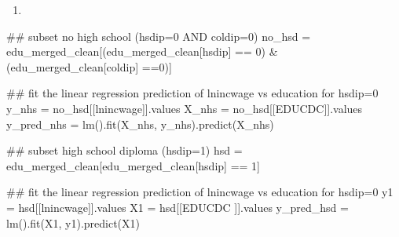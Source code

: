 \documentclass[
  letterpaper,
  DIV=11,
  numbers=noendperiod]{scrartcl}
\newenvironment{Shaded}{\begin{snugshade}}{\end{snugshade}}
\newcommand{\CommentTok}[1]{\textcolor[rgb]{0.37,0.37,0.37}{#1}}
\newcommand{\DecValTok}[1]{\textcolor[rgb]{0.68,0.00,0.00}{#1}}
\newcommand{\NormalTok}[1]{\textcolor[rgb]{0.00,0.23,0.31}{#1}}
\newcommand{\OperatorTok}[1]{\textcolor[rgb]{0.37,0.37,0.37}{#1}}
\newcommand{\StringTok}[1]{\textcolor[rgb]{0.13,0.47,0.30}{#1}}
\providecommand{\tightlist}{%
  \setlength{\itemsep}{0pt}\setlength{\parskip}{0pt}}\usepackage{longtable,booktabs,array}
\begin{document}
\begin{enumerate}
\def\labelenumi{\arabic{enumi}.}
\setcounter{enumi}{3}
\tightlist
\item
\end{enumerate}

\begin{Shaded}
\begin{Highlighting}[]
\CommentTok{\#\# subset no high school (hsdip=0 AND coldip=0)}
\NormalTok{no\_hsd }\OperatorTok{=}\NormalTok{ edu\_merged\_clean[(edu\_merged\_clean[}\StringTok{\textquotesingle{}hsdip\textquotesingle{}}\NormalTok{] }\OperatorTok{==} \DecValTok{0}\NormalTok{) }\OperatorTok{\&}\NormalTok{ (edu\_merged\_clean[}\StringTok{\textquotesingle{}coldip\textquotesingle{}}\NormalTok{] }\OperatorTok{==}\DecValTok{0}\NormalTok{)] }

\CommentTok{\#\# fit the linear regression prediction of lnincwage vs education for hsdip=0}
\NormalTok{y\_nhs }\OperatorTok{=}\NormalTok{ no\_hsd[[}\StringTok{\textquotesingle{}lnincwage\textquotesingle{}}\NormalTok{]].values}
\NormalTok{X\_nhs }\OperatorTok{=}\NormalTok{ no\_hsd[[}\StringTok{\textquotesingle{}EDUCDC\textquotesingle{}}\NormalTok{]].values}
\NormalTok{y\_pred\_nhs }\OperatorTok{=}\NormalTok{ lm().fit(X\_nhs, y\_nhs).predict(X\_nhs)}
\end{Highlighting}
\end{Shaded}

\begin{Shaded}
\begin{Highlighting}[]
\CommentTok{\#\# subset high school diploma (hsdip=1)}
\NormalTok{hsd }\OperatorTok{=}\NormalTok{ edu\_merged\_clean[edu\_merged\_clean[}\StringTok{\textquotesingle{}hsdip\textquotesingle{}}\NormalTok{] }\OperatorTok{==} \DecValTok{1}\NormalTok{]}

\CommentTok{\#\# fit the linear regression prediction of lnincwage vs education for hsdip=0}
\NormalTok{y1 }\OperatorTok{=}\NormalTok{ hsd[[}\StringTok{\textquotesingle{}lnincwage\textquotesingle{}}\NormalTok{]].values}
\NormalTok{X1 }\OperatorTok{=}\NormalTok{ hsd[[}\StringTok{\textquotesingle{}EDUCDC\textquotesingle{}}\NormalTok{ ]].values}
\NormalTok{y\_pred\_hsd }\OperatorTok{=}\NormalTok{ lm().fit(X1, y1).predict(X1)}
\end{Highlighting}
\end{Shaded}
\end{document}
